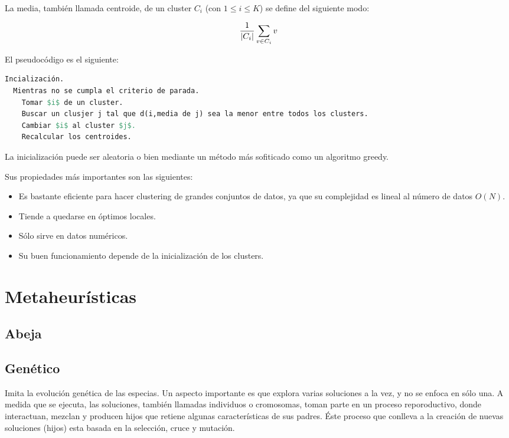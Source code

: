 La media, tambi\'en llamada centroide,  de un cluster $C_i$ (con $1 \leq i \leq K$)
se define del siguiente modo:

\[
{1 \over |C_{i}|} \sum_{v \in C_{i}} v
\]

El pseudoc\'odigo es el siguiente:

\begin{lstlisting}[mathescape, language=Pascal]
  Incialización.
  Mientras no se cumpla el criterio de parada.
    Tomar $i$ de un cluster.
    Buscar un clusjer j tal que d(i,media de j) sea la menor entre todos los clusters.
    Cambiar $i$ al cluster $j$.
    Recalcular los centroides.
\end{lstlisting}

La inicializaci\'on puede ser aleatoria o bien mediante un m\'etodo m\'as
sofiticado como un algoritmo greedy.

Sus propiedades m\'as importantes son las siguientes:

\begin{itemize}

\item Es bastante eficiente para hacer clustering de grandes conjuntos de datos,
ya que su complejidad es lineal al n\'umero de datos $O(N)$.

\item Tiende a quedarse en \'optimos locales.

\item S\'olo sirve en datos num\'ericos.

\item Su buen funcionamiento depende de la inicializaci\'on de los clusters.

\end{itemize}

\section{Metaheur\'isticas} \label{sect:meta}

\subsection{Abeja} \label{sect:metabee}

\subsection{Gen\'etico} \label{sect:metaga}

Imita la evoluci\'on gen\'etica de las especias. Un aspecto importante es que
explora varias soluciones a la vez, y no se enfoca en s\'olo una. A medida que
se ejecuta, las soluciones, tambi\'en llamadas individuos o cromosomas, 
toman parte en un proceso reporoductivo, donde interactuan, mezclan y producen
hijos que retiene algunas caracter\'isticas de sus padres. \'Este proceso
que conlleva a la creaci\'on de nuevas soluciones (hijos) esta basada en
la selecci\'on, cruce y mutaci\'on\cite{DoGeGr2007}.

